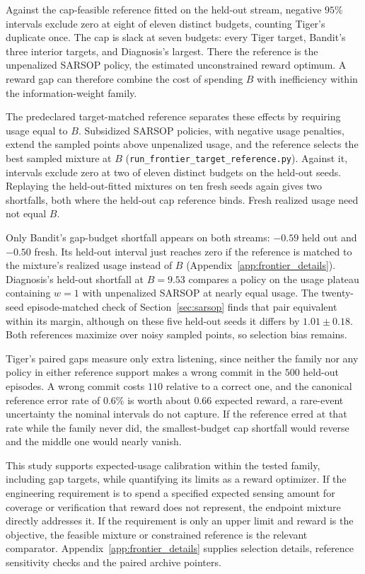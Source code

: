 \documentclass[manuscript, screen, review]{jair}
\begin{document}
Against the cap-feasible reference fitted on the held-out stream, negative $95\%$ intervals exclude zero at eight of eleven distinct budgets, counting Tiger's duplicate once. The cap is slack at seven budgets: every Tiger target, Bandit's three interior targets, and Diagnosis's largest. There the reference is the unpenalized SARSOP policy, the estimated unconstrained reward optimum. A reward gap can therefore combine the cost of spending $B$ with inefficiency within the information-weight family.

The predeclared target-matched reference separates these effects by requiring usage equal to $B$. Subsidized SARSOP policies, with negative usage penalties, extend the sampled points above unpenalized usage, and the reference selects the best sampled mixture at $B$ (\texttt{run\_\allowbreak frontier\_\allowbreak target\_\allowbreak reference.py}). Against it, intervals exclude zero at two of eleven distinct budgets on the held-out seeds. Replaying the held-out-fitted mixtures on ten fresh seeds again gives two shortfalls, both where the held-out cap reference binds. Fresh realized usage need not equal $B$.

Only Bandit's gap-budget shortfall appears on both streams: $-0.59$ held out and $-0.50$ fresh. Its held-out interval just reaches zero if the reference is matched to the mixture's realized usage instead of $B$ (Appendix~\ref{app:frontier_details}). Diagnosis's held-out shortfall at $B{=}9.53$ compares a policy on the usage plateau containing $w{=}1$ with unpenalized SARSOP at nearly equal usage. The twenty-seed episode-matched check of Section~\ref{sec:sarsop} finds that pair equivalent within its margin, although on these five held-out seeds it differs by $1.01\pm0.18$. Both references maximize over noisy sampled points, so selection bias remains.

Tiger's paired gaps measure only extra listening, since neither the family nor any policy in either reference support makes a wrong commit in the $500$ held-out episodes. A wrong commit costs $110$ relative to a correct one, and the canonical reference error rate of $0.6\%$ is worth about $0.66$ expected reward, a rare-event uncertainty the nominal intervals do not capture. If the reference erred at that rate while the family never did, the smallest-budget cap shortfall would reverse and the middle one would nearly vanish.

This study supports expected-usage calibration within the tested family, including gap targets, while quantifying its limits as a reward optimizer. If the engineering requirement is to spend a specified expected sensing amount for coverage or verification that reward does not represent, the endpoint mixture directly addresses it. If the requirement is only an upper limit and reward is the objective, the feasible mixture or constrained reference is the relevant comparator. Appendix~\ref{app:frontier_details} supplies selection details, reference sensitivity checks and the paired archive pointers.
\end{document}
